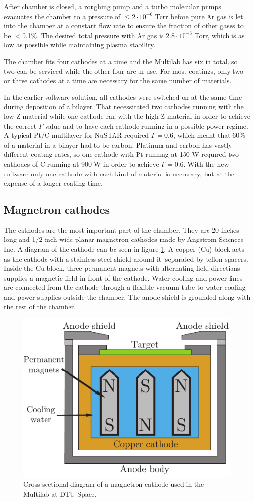 After chamber is closed, a roughing pump and a turbo molecular pumps evacuates the chamber to a pressure of $\leq2\cdot10^{-6}$ Torr before pure Ar gas is let into the chamber at a constant flow rate to ensure the fraction of other gases to be $<$0.1\%. The desired total pressure with Ar gas is $2.8\cdot10^{-3}$ Torr, which is as low as possible while maintaining plasma stability.

The chamber fits four cathodes at a time and the Multilab has six in total, so two can be serviced while the other four are in use. For most coatings, only two or three cathodes at a time are necessary for the same number of materials.

In the earlier software solution, all cathodes were switched on at the same time during deposition of a bilayer. That necessitated two cathodes running with the low-Z material while one cathode ran with the high-Z material in order to achieve the correct $\Gamma$ value and to have each cathode running in a possible power regime. A typical Pt/C  multilayer for NuSTAR required $\Gamma = 0.6$, which meant that 60\% of a material in a bilayer had to be carbon. Platinum and carbon has vastly different coating rates, so one cathode with Pt running at 150 W required two cathodes of C running at 900 W in order to achieve $\Gamma = 0.6$. With the new software only one cathode with each kind of material is necessary, but at the expense of a longer coating time.

\subsection{Magnetron cathodes}
The cathodes are the most important part of the chamber. They are 20 inches long and 1/2 inch wide planar magnetron cathodes made by Angstrom Sciences Inc. A diagram of the cathode can be seen in figure \ref{fig:cathodeintersection}. A copper (Cu) block acts as the cathode with a stainless steel shield around it, separated by teflon spacers. Inside the Cu block, three permanent magnets with alternating field directions supplies a magnetic field in front of the cathode. Water cooling and power lines are connected from the cathode through a flexible vacuum tube to water cooling and power supplies outside the chamber. The anode shield is grounded along with the rest of the chamber.

\begin{figure}[htbp]
  \centering  \includegraphics[width=0.5\linewidth]{figures/chamber/cathodeintersection.pdf}
  \caption{\footnotesize Cross-sectional diagram of a magnetron cathode used in the Multilab at DTU Space. }
  \label{fig:cathodeintersection}
\end{figure}

